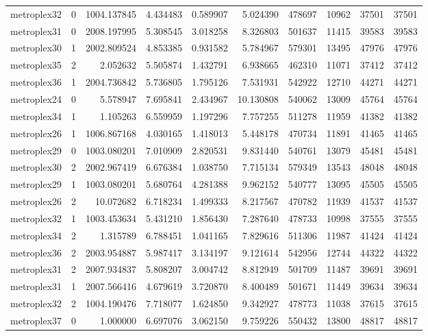 \begin{longtable}{|l|r|r|r|r|r|r|r|r|r|}
metroplex32 & 0 & 1004.137845 & 4.434483 & 0.589907 & 5.024390 & 478697 & 10962 & 37501 & 37501 \\
metroplex31 & 0 & 2008.197995 & 5.308545 & 3.018258 & 8.326803 & 501637 & 11415 & 39583 & 39583 \\
metroplex30 & 1 & 2002.809524 & 4.853385 & 0.931582 & 5.784967 & 579301 & 13495 & 47976 & 47976 \\
metroplex35 & 2 & 2.052632 & 5.505874 & 1.432791 & 6.938665 & 462310 & 11071 & 37412 & 37412 \\
metroplex36 & 1 & 2004.736842 & 5.736805 & 1.795126 & 7.531931 & 542922 & 12710 & 44271 & 44271 \\
metroplex24 & 0 & 5.578947 & 7.695841 & 2.434967 & 10.130808 & 540062 & 13009 & 45764 & 45764 \\
metroplex34 & 1 & 1.105263 & 6.559959 & 1.197296 & 7.757255 & 511278 & 11959 & 41382 & 41382 \\
metroplex26 & 1 & 1006.867168 & 4.030165 & 1.418013 & 5.448178 & 470734 & 11891 & 41465 & 41465 \\
metroplex29 & 0 & 1003.080201 & 7.010909 & 2.820531 & 9.831440 & 540761 & 13079 & 45481 & 45481 \\
metroplex30 & 2 & 2002.967419 & 6.676384 & 1.038750 & 7.715134 & 579349 & 13543 & 48048 & 48048 \\
metroplex29 & 1 & 1003.080201 & 5.680764 & 4.281388 & 9.962152 & 540777 & 13095 & 45505 & 45505 \\
metroplex26 & 2 & 10.072682 & 6.718234 & 1.499333 & 8.217567 & 470782 & 11939 & 41537 & 41537 \\
metroplex32 & 1 & 1003.453634 & 5.431210 & 1.856430 & 7.287640 & 478733 & 10998 & 37555 & 37555 \\
metroplex34 & 2 & 1.315789 & 6.788451 & 1.041165 & 7.829616 & 511306 & 11987 & 41424 & 41424 \\
metroplex36 & 2 & 2003.954887 & 5.987417 & 3.134197 & 9.121614 & 542956 & 12744 & 44322 & 44322 \\
metroplex31 & 2 & 2007.934837 & 5.808207 & 3.004742 & 8.812949 & 501709 & 11487 & 39691 & 39691 \\
metroplex31 & 1 & 2007.566416 & 4.679619 & 3.720870 & 8.400489 & 501671 & 11449 & 39634 & 39634 \\
metroplex32 & 2 & 1004.190476 & 7.718077 & 1.624850 & 9.342927 & 478773 & 11038 & 37615 & 37615 \\
metroplex37 & 0 & 1.000000 & 6.697076 & 3.062150 & 9.759226 & 550432 & 13800 & 48817 & 48817 \\

\end{longtable}
